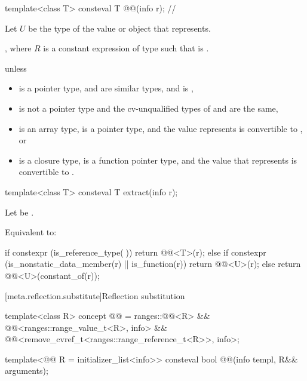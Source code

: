\begin{itemdecl}
template<class T>
  consteval T @@(info r);    // \expos
\end{itemdecl}

\begin{itemdescr}
\pnum
Let $U$ be the type of the value or object that  represents.

\pnum
\returns
{},
where $R$ is a constant expression of type 
such that  is .

\pnum
\throws
{} unless
\begin{itemize}
\item
   is a pointer type,
   and  are similar types, and
   is ,
\item
   is not a pointer type
  and the cv-unqualified types of  and  are the same,
\item
   is an array type,
   is a pointer type, and
  the value  represents is convertible to , or
\item
   is a closure type,
   is a function pointer type, and
  the value that  represents is convertible to .
\end{itemize}
\end{itemdescr}

%
\begin{itemdecl}
template<class T>
  consteval T extract(info r);
\end{itemdecl}

\begin{itemdescr}
\pnum
Let  be .

\pnum
\effects
Equivalent to:
\begin{codeblock}
if constexpr (is_reference_type(^^T)) {
  return @@<T>(r);
} else if constexpr (is_nonstatic_data_member(r) || is_function(r)) {
  return @@<U>(r);
} else {
  return @@<U>(constant_of(r));
}
\end{codeblock}
\end{itemdescr}

[meta.reflection.substitute]{Reflection substitution}

\begin{itemdecl}
template<class R>
concept @@ =
  ranges::@@<R> &&
  @@<ranges::range_value_t<R>, info> &&
  @@<remove_cvref_t<ranges::range_reference_t<R>>, info>;

template<@@ R = initializer_list<info>>
consteval bool @@(info templ, R&& arguments);
\end{itemdecl}

